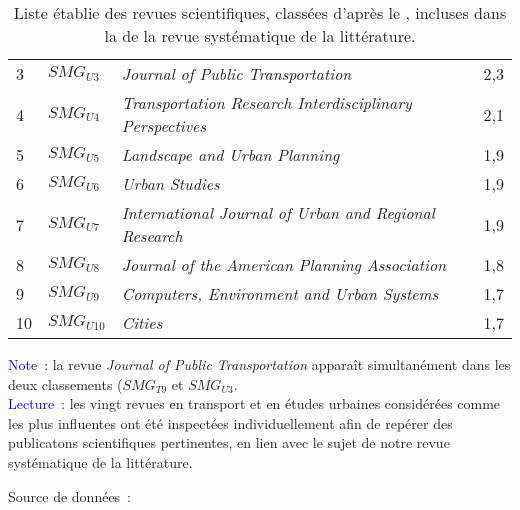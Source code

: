 \begin{table}[h!]
{\begin{tabular}{p{}p{}p{}p{}}
\small{3} & \small{\(SMG_{U3}\)} & \small{\textsl{Journal of Public Transportation}} & \small{2,3}\\
\small{4} & \small{\(SMG_{U4}\)} & \small{\textsl{Transportation Research Interdisciplinary Perspectives}} & \small{2,1}\\
\small{5} & \small{\(SMG_{U5}\)} & \small{\textsl{Landscape and Urban Planning}} & \small{1,9}\\
\small{6} & \small{\(SMG_{U6}\)} & \small{\textsl{Urban Studies}} & \small{1,9}\\
\small{7} & \small{\(SMG_{U7}\)} & \small{\textsl{International Journal of Urban and Regional Research}} & \small{1,9}\\
\small{8} & \small{\(SMG_{U8}\)} & \small{\textsl{Journal of the American Planning Association}} & \small{1,8}\\
\small{9} & \small{\(SMG_{U9}\)} & \small{\textsl{Computers, Environment and Urban Systems}} & \small{1,7}\\
\small{10} & \small{\(SMG_{U10}\)} & \small{\textsl{Cities}} & \small{1,7}\\
        \hline
        \end{tabular}}
    \caption{Liste établie des revues scientifiques, classées d'après le , incluses dans la  de la revue systématique de la littérature.}
    \label{table-chap2:revues-scientifiques-rsl}
        \vspace{5pt}
        \begin{flushleft}\scriptsize{
        \textcolor{blue}{Note~:} la revue \textsl{Journal of Public Transportation} apparaît simultanément dans les deux classements (\(SMG_{T9}\) et \(SMG_{U3}\).
        \\
        \textcolor{blue}{Lecture~:} les vingt revues en transport et en études urbaines considérées comme les plus influentes ont été inspectées individuellement afin de repérer des publicatons scientifiques pertinentes, en lien avec le sujet de notre revue systématique de la littérature.
        }\end{flushleft}
        \begin{flushright}\scriptsize{
        Source de données~: ~\textcolor{blue}{\autocite{sjr_scimago_2023}}
        }\end{flushright}
        \end{table}